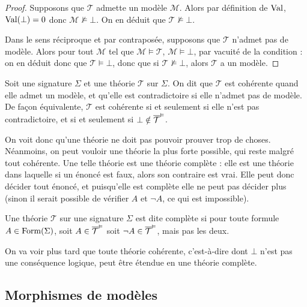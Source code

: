 \begin{proof}
  Supposons que $\mathcal T$ admette un modèle $\mathcal M$. Alors par
  définition de $\operatorname{Val}$, $\operatorname{Val}(\bot) = 0$ donc $\mathcal M\not\models \bot$. On
  en déduit que $\mathcal T\nvDash\bot$.

  Dans le sens réciproque et par contraposée, supposons que $\mathcal T$ n'admet
  pas de modèle. Alors pour tout $\mathcal M$ tel que
  $\mathcal M\models \mathcal T$, $\mathcal M\models \bot$, par vacuité de la
  condition : on en déduit donc que $\mathcal T \vDash \bot$, donc que si
  $\mathcal T \nvDash\bot$, alors $\mathcal T$ a un modèle.
\end{proof}

\begin{definition}
  Soit une signature $\Sigma$ et une théorie $\mathcal T$ sur $\Sigma$. On dit
  que $\mathcal T$ est cohérente quand elle admet un modèle, et qu'elle est
  contradictoire si elle n'admet pas de modèle. De façon équivalente,
  $\mathcal T$ est cohérente si et seulement si elle n'est pas contradictoire,
  et si et seulement si $\bot\notin\overline{\mathcal T}^{\vDash}$.
\end{definition}

On voit donc qu'une théorie ne doit pas pouvoir prouver trop de choses.
Néanmoins, on peut vouloir une théorie la plus forte possible, qui reste malgré
tout cohérente. Une telle théorie est une théorie complète : elle est une
théorie dans laquelle si un énoncé est faux, alors son contraire est vrai. Elle
peut donc décider tout énoncé, et puisqu'elle est complète elle ne peut pas
décider plus (sinon il serait possible de vérifier $A$ et $\lnot A$, ce qui est
impossible).

\begin{definition}
  Une théorie $\mathcal T$ sur une signature $\Sigma$ est dite complète si pour
  toute formule $A\in\operatorname{Form}(\Sigma)$, soit $A\in \overline{\mathcal T}^{\vDash}$ soit
  $\lnot A \in \overline{\mathcal T}^{\vDash}$, mais pas les deux.
\end{definition}

On va voir plus tard que toute théorie cohérente, c'est-à-dire dont $\bot$ n'est
pas une conséquence logique, peut être étendue en une théorie complète.

\subsection{Morphismes de modèles}

